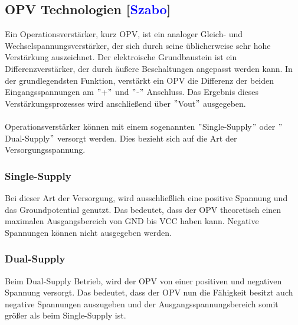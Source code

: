 \documentclass[titlepage,12pt,twoside]{article}
\begin{document}
\subsection{OPV Technologien [\textcolor{blue}{Szabo}]}
\label{chap:OPV Technologien}
Ein Operationsverstärker, kurz OPV, ist ein analoger Gleich- und Wechselspannungsverstärker, der sich durch seine üblicherweise sehr hohe 
Verstärkung auszeichnet. Der elektroische Grundbaustein ist ein Differenzverstärker, der durch äußere Beschaltungen angepasst werden kann.
In der grundlegendsten Funktion, verstärkt ein OPV die Differenz der beiden Eingangsspannungen am $"$+$"$ und $"$-$"$ Anschluss. Das Ergebnis
dieses Verstärkungsprozesses wird anschließend über $"$Vout$"$ ausgegeben. \\
\\
Operationsverstärker können mit einem sogenannten $"$Single-Supply$"$ oder $"$Dual-Supply$"$ versorgt werden. Dies bezieht sich auf
die Art der Versorgungsspannung. \\

\subsubsection{Single-Supply}
Bei dieser Art der Versorgung, wird ausschließlich eine positive Spannung und das Groundpotential genutzt. Das bedeutet, dass der OPV
theoretisch einen maximalen Ausgangsbereich von GND bis VCC haben kann. Negative Spannungen können nicht ausgegeben werden. \\

\subsubsection{Dual-Supply}
Beim Dual-Supply Betrieb, wird der OPV von einer positiven und negativen Spannung versorgt. Das bedeutet, dass der OPV nun die Fähigkeit
besitzt auch negative Spannungen auszugeben und der Ausgangsspannungsbereich somit größer als beim Single-Supply ist. \\
\end{document}
